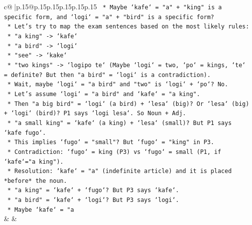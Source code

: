 \documentclass{article}
\begin{document}
{\begin{supertabular}{c@{$\;$}|p{.15\linewidth}@{}p{.15\linewidth}p{.15\linewidth}p{.15\linewidth}p{.15\linewidth}p{.15\linewidth}}
{{{\texttt{                                    *   Maybe `kafe` = "a" + "king" is a specific form, and `logi` = "a" + "bird" is a specific form?} \\
\texttt{                                    *   Let's try to map the exam sentences based on the most likely rules:} \\
\texttt{                                        *   "a king" {-}> `kafe`} \\
\texttt{                                        *   "a bird" {-}> `logi`} \\
\texttt{                                        *   "see" {-}> `kake`} \\
\texttt{                                        *   "two kings" {-}> `logipo te` (Maybe `logi` = two, `po` = kings, `te` = definite? But then "a bird" = `logi` is a contradiction).} \\
\texttt{                                        *   Wait, maybe `logi` = "a bird" and "two" is `logi` + `po`? No.} \\
\texttt{                                        *   Let's assume `logi` = "a bird" and `kafe` = "a king".} \\
\texttt{                                        *   Then "a big bird" = `logi` (a bird) + `lesa` (big)? Or `lesa` (big) + `logi` (bird)? P1 says `logi lesa`. So Noun + Adj.} \\
\texttt{                                        *   "a small king" = `kafe` (a king) + `lesa` (small)? But P1 says `kafe fugo`.} \\
\texttt{                                        *   This implies `fugo` = "small"? But `fugo` = "king" in P3.} \\
\texttt{                                        *   Contradiction: `fugo` = king (P3) vs `fugo` = small (P1, if `kafe`="a king").} \\
\texttt{                                        *   Resolution: `kafe` = "a" (indefinite article) and it is placed *before* the noun.} \\
\texttt{                                            *   "a king" = `kafe` + `fugo`? But P3 says `kafe`.} \\
\texttt{                                            *   "a bird" = `kafe` + `logi`? But P3 says `logi`.} \\
\texttt{                                        *   Maybe `kafe` = "a} \\
            }
        }
    }
    & & \\ \\


\end{supertabular}}
\end{document}
